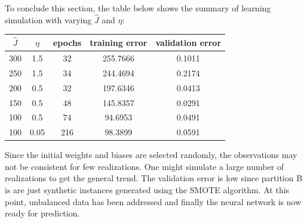 \documentclass{article}
\begin{document}
To conclude this section, the table below shows the summary of learning simulation with varying $\hat{J}$ and $\eta$:

\begin{table}[H]
	\centering
	\begin{tabular}{c | c | c | c | c}
		$\hat{J}$ & $\eta$ & epochs & training error & validation error\\
		\hline
		300 & 1.5 & 32 & 255.7666 & 0.1011\\
		250 & 1.5 & 34 & 244.4694 & 0.2174\\
		200 & 0.5 & 32 & 197.6346 & 0.0413\\
		150 & 0.5 & 48 & 145.8357 & 0.0291\\
		100 & 0.5 & 74 & 94.6953 & 0.0491\\
		100 & 0.05 & 216 & 98.3899 & 0.0591\\
	\end{tabular}
\end{table}

Since the initial weights and biases are selected randomly, the observations may not be consistent for few realizations. One might simulate a large number of realizations to get the general trend. The validation error is low since partition B is are just synthetic instances generated using the SMOTE algorithm. At this point, unbalanced data has been addressed and finally the neural network is now ready for prediction.
\end{document}
